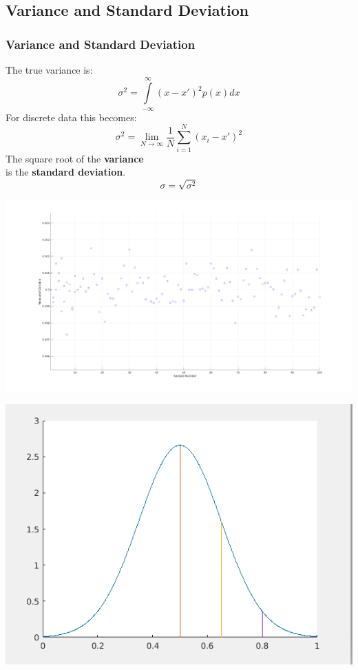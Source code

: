 \documentclass[fleqn]{beamer} %
\newcommand{\sectionIIsubsectionIItitle}{Variance and Standard Deviation}
\begin{document}
		\subsection{\sectionIIsubsectionIItitle}\label{sectionIIsubsectionII}

			\begin{frame}
				\frametitle{\sectionIIsubsectionIItitle}

				\begin{multicols}{2} \tiny
				The true variance is:\\
				\[ \sigma^2=\int\limits_{-\infty}^{\infty}(x-x')^2p(x)dx \]
				For discrete data this becomes:\\
				\[ \sigma^2=\lim\limits_{N\rightarrow \infty}\frac{1}{N}\sum\limits_{i=1}^{N}(x_i-x')^2 \]
				The square root of the {\bf \BL variance} \\
				is the {\bf \PR standard deviation}. \\
				\[\sigma=\sqrt{\sigma^2}\]

				\hspace*{-1.5cm}\includegraphics[scale=.20]{images/topic2_measured_fig2.png}		
				
				\end{multicols}

			\end{frame}

			\begin{frame}
				\includegraphics[scale=.50]{images/lecture1_fig1.png}
			\end{frame}
\end{document}
